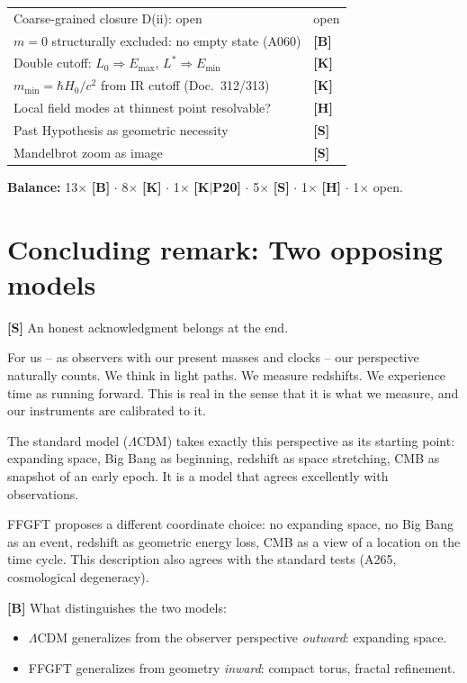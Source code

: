 \begin{center}
\begin{longtable}{@{}p{}l@{}}
		Coarse-grained closure D(ii): open & open \\
		$m=0$ structurally excluded: no empty state (A060) & \textbf{[B]} \\
		Double cutoff: $L_0 \Rightarrow E_\text{max}$, $L^* \Rightarrow E_\text{min}$ & \textbf{[K]} \\
		$m_\text{min} = \hbar H_0/c^2$ from IR cutoff (Doc.~312/313) & \textbf{[K]} \\
		Local field modes at thinnest point resolvable? & \textbf{[H]} \\
		Past Hypothesis as geometric necessity & \textbf{[S]} \\
		Mandelbrot zoom as image & \textbf{[S]} \\
		\bottomrule
	\end{longtable}
\end{center}

\textbf{Balance:} 13$\times$ \textbf{[B]} $\cdot$
8$\times$ \textbf{[K]} $\cdot$
1$\times$ \textbf{[K$|$P20]} $\cdot$
5$\times$ \textbf{[S]} $\cdot$
1$\times$ \textbf{[H]} $\cdot$
1$\times$ open.

\section{Concluding remark: Two opposing models}

\textbf{[S]} An honest acknowledgment belongs at the end.

For us -- as observers with our present masses and clocks
-- our perspective naturally counts. We think in light paths.
We measure redshifts. We experience time as running forward.
This is real in the sense that it is what we measure, and our
instruments are calibrated to it.

The standard model ($\Lambda$CDM) takes exactly this perspective
as its starting point: expanding space, Big Bang as beginning,
redshift as space stretching, CMB as snapshot of an early epoch.
It is a model that agrees excellently with observations.

FFGFT proposes a different coordinate choice: no expanding space,
no Big Bang as an event, redshift as geometric energy loss,
CMB as a view of a location on the time cycle. This description
also agrees with the standard tests (A265, cosmological degeneracy).

\textbf{[B]} What distinguishes the two models:

\begin{itemize}[leftmargin=1.4em,itemsep=0.2em]
	\item $\Lambda$CDM generalizes from the observer perspective
	\emph{outward}: expanding space.
	\item FFGFT generalizes from geometry \emph{inward}:
	compact torus, fractal refinement.
\end{itemize}

